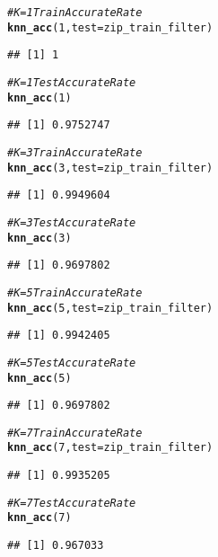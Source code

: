 \documentclass[english]{article}\usepackage[]{graphicx}\usepackage[]{color}
\makeatletter
\newcommand{\hlnum}[1]{\textcolor[rgb]{0.686,0.059,0.569}{#1}}%
\newcommand{\hlcom}[1]{\textcolor[rgb]{0.678,0.584,0.686}{\textit{#1}}}%
\newcommand{\hlstd}[1]{\textcolor[rgb]{0.345,0.345,0.345}{#1}}%
\newcommand{\hlkwc}[1]{\textcolor[rgb]{0.333,0.667,0.333}{#1}}%
\newcommand{\hlkwd}[1]{\textcolor[rgb]{0.737,0.353,0.396}{\textbf{#1}}}%
\newenvironment{kframe}{%
 \def\at@end@of@kframe{}%
 \ifinner\ifhmode%
  \def\at@end@of@kframe{\end{minipage}}%
  \begin{minipage}{\columnwidth}%
 \fi\fi%
 \def\FrameCommand##1{\hskip\@totalleftmargin \hskip-\fboxsep
 \colorbox{shadecolor}{##1}\hskip-\fboxsep
     \hskip-\linewidth \hskip-\@totalleftmargin \hskip\columnwidth}%
 \MakeFramed {\advance\hsize-\width
   \@totalleftmargin\z@ \linewidth\hsize
   \@setminipage}}%
 {\par\unskip\endMakeFramed%
 \at@end@of@kframe}
\newenvironment{knitrout}{}{} %
\makeatother
\begin{document}
\begin{knitrout}
\begin{kframe}
\begin{alltt}
\hlcom{# K = 1 Train Accurate Rate}
\hlkwd{knn_acc}\hlstd{(}\hlnum{1}\hlstd{,} \hlkwc{test} \hlstd{= zip_train_filter)}
\end{alltt}
\begin{verbatim}
## [1] 1
\end{verbatim}
\begin{alltt}
\hlcom{# K = 1 Test Accurate Rate}
\hlkwd{knn_acc}\hlstd{(}\hlnum{1}\hlstd{)}
\end{alltt}
\begin{verbatim}
## [1] 0.9752747
\end{verbatim}
\begin{alltt}
\hlcom{# K = 3 Train Accurate Rate}
\hlkwd{knn_acc}\hlstd{(}\hlnum{3}\hlstd{,} \hlkwc{test} \hlstd{= zip_train_filter)}
\end{alltt}
\begin{verbatim}
## [1] 0.9949604
\end{verbatim}
\begin{alltt}
\hlcom{# K = 3 Test Accurate Rate}
\hlkwd{knn_acc}\hlstd{(}\hlnum{3}\hlstd{)}
\end{alltt}
\begin{verbatim}
## [1] 0.9697802
\end{verbatim}
\begin{alltt}
\hlcom{# K = 5 Train Accurate Rate}
\hlkwd{knn_acc}\hlstd{(}\hlnum{5}\hlstd{,} \hlkwc{test} \hlstd{= zip_train_filter)}
\end{alltt}
\begin{verbatim}
## [1] 0.9942405
\end{verbatim}
\begin{alltt}
\hlcom{# K = 5 Test Accurate Rate}
\hlkwd{knn_acc}\hlstd{(}\hlnum{5}\hlstd{)}
\end{alltt}
\begin{verbatim}
## [1] 0.9697802
\end{verbatim}
\begin{alltt}
\hlcom{# K = 7 Train Accurate Rate}
\hlkwd{knn_acc}\hlstd{(}\hlnum{7}\hlstd{,} \hlkwc{test} \hlstd{= zip_train_filter)}
\end{alltt}
\begin{verbatim}
## [1] 0.9935205
\end{verbatim}
\begin{alltt}
\hlcom{# K = 7 Test Accurate Rate}
\hlkwd{knn_acc}\hlstd{(}\hlnum{7}\hlstd{)}
\end{alltt}
\begin{verbatim}
## [1] 0.967033
\end{verbatim}

\end{kframe}
\end{knitrout}
\end{document}
